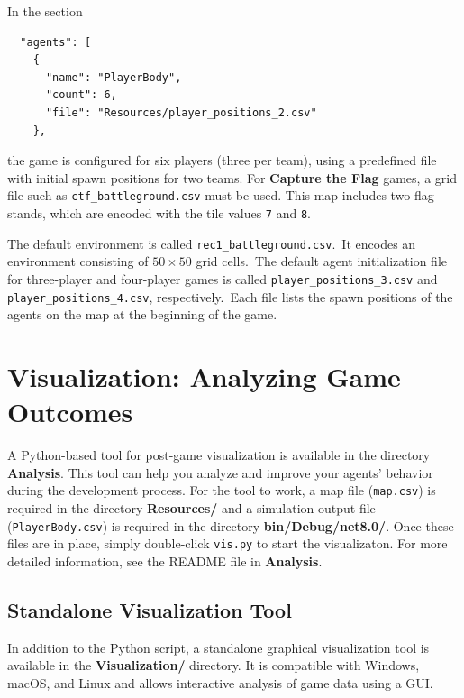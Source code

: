 \documentclass[a4paper,english,DIV=16,11pt,parskip=half,dvipsnames,listof=totoc,index=totoc,bibliography=totoc]{scrartcl}
\begin{document}
In the section
\begin{lstlisting}
  "agents": [
    {
      "name": "PlayerBody",
      "count": 6,
      "file": "Resources/player_positions_2.csv"
    },
\end{lstlisting}
the game is configured for six players (three per team), using a predefined file with initial spawn positions for two teams. For \textbf{Capture the Flag} games, a grid file such as \texttt{ctf\_battleground.csv} must be used. This map includes two flag stands, which are encoded with the tile values \texttt{7} and \texttt{8}.

%
The default environment is called \texttt{rec1\_battleground.csv}.~It encodes an environment consisting of $50\times 50$ grid cells.~The default agent initialization file for three-player and four-player games is called \texttt{player\_positions\_3.csv} and \texttt{player\_positions\_4.csv}, respectively.~Each file lists the spawn positions of the agents on the map at the beginning of the game.
%
\section{Visualization: Analyzing Game Outcomes} \label{sec:vis}

A Python-based tool for post-game visualization is available in the directory \textbf{Analysis}. This tool can help you analyze and improve your agents' behavior during the development process. For the tool to work, a map file (\texttt{map.csv}) is required in the directory \textbf{Resources/} and a simulation output file (\texttt{PlayerBody.csv}) is required in the directory \textbf{bin/Debug/net8.0/}. Once these files are in place, simply double-click \texttt{vis.py} to start the visualizaton. For more detailed information, see the README file in \textbf{Analysis}.

\subsection{Standalone Visualization Tool}\label{sec:vis:stand}
In addition to the Python script, a standalone graphical visualization tool is available in the \textbf{Visualization/} directory. It is compatible with Windows, macOS, and Linux and allows interactive analysis of game data using a GUI.
\end{document}
